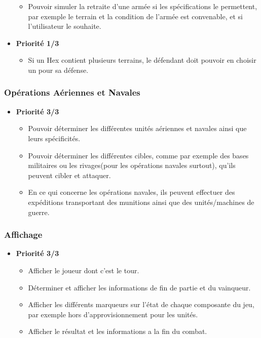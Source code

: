 \documentclass{article}[a4paper, 12pt]
\begin{document}
\begin{itemize}
\begin{itemize}
\begin{itemize}
        \end{itemize}
        \item Pouvoir simuler la retraite d'une armée si les spécifications le permettent, par exemple le terrain et la condition de l'armée est convenable, et si l'utilisateur le souhaite.
    \end{itemize}
    \item \textbf{Priorité 1/3}
    \begin{itemize}
        \item Si un Hex contient plusieurs terrains, le défendant doit pouvoir en choisir un pour sa défense.
    \end{itemize}
\end{itemize}

\subsubsection{Opérations Aériennes et Navales}
\begin{itemize}
    \item \textbf{Priorité 3/3}
    \begin{itemize}
        \item Pouvoir déterminer les différentes unités aériennes et navales ainsi que leurs spécificités.
        \item Pouvoir déterminer les différentes cibles, comme par exemple des bases militaires ou les rivages(pour les opérations navales surtout), qu'ils peuvent cibler et attaquer.
        \item En ce qui concerne les opérations navales, ils peuvent effectuer des expéditions transportant des munitions ainsi que des unités/machines de guerre.
    \end{itemize}
\end{itemize}

\subsubsection{Affichage}
\begin{itemize}
    \item \textbf{Priorité 3/3}
    \begin{itemize}
        \item Afficher le joueur dont c'est le tour.
        \item Déterminer et afficher les informations de fin de partie et du vainqueur.
        \item Afficher les différents marqueurs sur l'état de chaque composante du jeu, par exemple hors d'approvisionnement pour les unités.
        \item Afficher le résultat et les informations a la fin du combat.
    \end{itemize}
\end{itemize}
\end{document}
